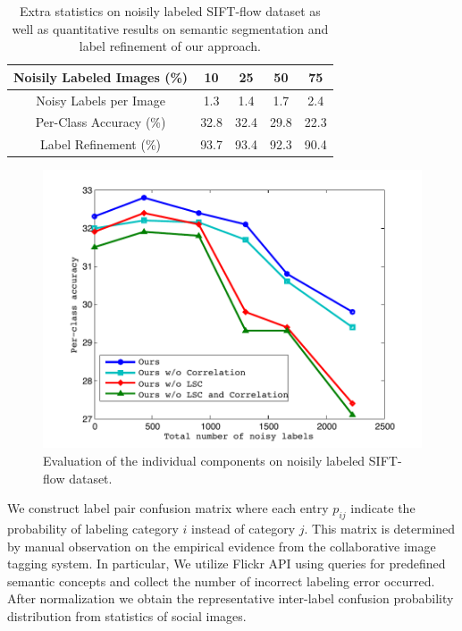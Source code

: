 \begin{table}[h]
\begin{center}
\begin{tabular}{|c|c|c|c|c|}
\hline
Noisily Labeled Images (\%) & 10 & 25 & 50 & 75 \\
\hline
Noisy Labels per Image & 1.3 & 1.4 & 1.7 & 2.4 \\
\hline
Per-Class Accuracy (\%) & 32.8 & 32.4 & 29.8 & 22.3 \\
\hline
Label Refinement (\%) & 93.7 & 93.4 & 92.3 & 90.4 \\
\hline
\end{tabular}
\end{center}
\caption{Extra statistics on noisily labeled SIFT-flow dataset as well as quantitative results on semantic segmentation and label refinement of our approach.}
\label{tab:ExpNoise}
\end{table}

\begin{figure}[h]
\begin{center}
    \includegraphics[width=1\linewidth]{fig_noisylabel.pdf}
\end{center}
\vspace{-3mm}
\caption{Evaluation of the individual components on noisily labeled SIFT-flow dataset.}
\label{fig:noisyexp}
\end{figure}

We construct label pair confusion matrix where each entry $p_{ij}$ indicate the probability of labeling category $i$ instead of category $j$. This matrix is determined by manual observation on the empirical evidence from the collaborative image tagging system. In particular, We utilize Flickr API using queries for predefined semantic concepts and collect the number of incorrect labeling error occurred. After normalization we obtain the representative inter-label confusion probability distribution from statistics of social images.

